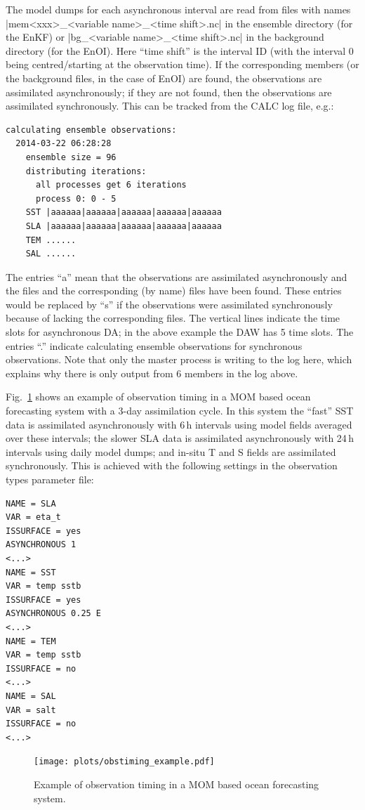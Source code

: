 \documentclass[11pt]{report}
\begin{document}
The model dumps for each asynchronous interval are read from files with names \spverb|mem<xxx>_<variable name>_<time shift>.nc| in the ensemble directory (for the EnKF) or \spverb|bg_<variable name>_<time shift>.nc| in the background directory (for the EnOI).
Here ``time shift'' is the interval ID (with the interval 0 being centred/starting at the observation time).
If the corresponding members (or the background files, in the case of EnOI) are found, the observations are assimilated asynchronously; if they are not found, then the observations are assimilated synchronously.
This can be tracked from the CALC log file, e.g.:
\begin{Verbatim}[frame=single,fontsize=\footnotesize]
  calculating ensemble observations:
  2014-03-22 06:28:28
    ensemble size = 96
    distributing iterations:
      all processes get 6 iterations
      process 0: 0 - 5
    SST |aaaaaa|aaaaaa|aaaaaa|aaaaaa|aaaaaa
    SLA |aaaaaa|aaaaaa|aaaaaa|aaaaaa|aaaaaa
    TEM ......
    SAL ......
\end{Verbatim}
The entries ``a'' mean that the observations are assimilated asynchronously and the files and the corresponding (by name) files have been found.
These entries would be replaced by ``s'' if the observations were assimilated synchronously because of lacking the corresponding files.
The vertical lines indicate the time slots for asynchronous DA; in the above example the DAW has 5 time slots.
The entries ``.'' indicate calculating ensemble observations for synchronous observations.
Note that only the master process is writing to the log here, which explains why there is only output from 6 members in the log above.

Fig.~\ref{fig:mom_timing} shows an example of observation timing in a MOM based ocean forecasting system with a 3-day assimilation cycle.
In this system the ``fast'' SST data is assimilated asynchronously with 6\,h intervals using model fields averaged over these intervals; the slower SLA data is assimilated asynchronously with 24\,h intervals using daily model dumps; and in-situ T and S fields are assimilated synchronously.
This is achieved with the following settings in the observation types parameter file:
\begin{Verbatim}[frame=single,fontsize=\footnotesize]
NAME = SLA
VAR = eta_t
ISSURFACE = yes
ASYNCHRONOUS 1
<...>
NAME = SST
VAR = temp sstb
ISSURFACE = yes
ASYNCHRONOUS 0.25 E
<...>
NAME = TEM
VAR = temp sstb
ISSURFACE = no
<...>
NAME = SAL
VAR = salt
ISSURFACE = no
<...>
\end{Verbatim}
\begin{figure}[h]
  \centering
  \texttt{[image: plots/obstiming\_example.pdf]}
  \caption{Example of observation timing in a MOM based ocean forecasting system.}
  \label{fig:mom_timing}
\end{figure}
\end{document}
